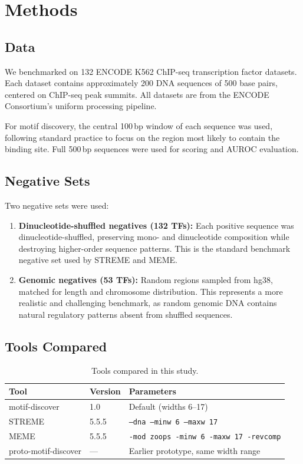 \section{Methods}
\label{sec:methods}

\subsection{Data}

We benchmarked on 132 ENCODE K562 ChIP-seq transcription factor datasets. Each dataset contains approximately 200 DNA sequences of 500 base pairs, centered on ChIP-seq peak summits. All datasets are from the ENCODE Consortium's uniform processing pipeline.

For motif discovery, the central 100\,bp window of each sequence was used, following standard practice to focus on the region most likely to contain the binding site. Full 500\,bp sequences were used for scoring and AUROC evaluation.

\subsection{Negative Sets}

Two negative sets were used:

\begin{enumerate}
    \item \textbf{Dinucleotide-shuffled negatives (132 TFs):} Each positive sequence was dinucleotide-shuffled, preserving mono- and dinucleotide composition while destroying higher-order sequence patterns. This is the standard benchmark negative set used by STREME and MEME.
    
    \item \textbf{Genomic negatives (53 TFs):} Random regions sampled from hg38, matched for length and chromosome distribution. This represents a more realistic and challenging benchmark, as random genomic DNA contains natural regulatory patterns absent from shuffled sequences.
\end{enumerate}

\subsection{Tools Compared}

\begin{table}[H]
\centering
\caption{Tools compared in this study.}
\label{tab:tools}
\small
\begin{tabular}{lll}
\toprule
Tool & Version & Parameters \\
\midrule
motif-discover       & 1.0    & Default (widths 6--17) \\
STREME               & 5.5.5  & \texttt{--dna --minw 6 --maxw 17} \\
MEME                 & 5.5.5  & \texttt{-mod zoops -minw 6 -maxw 17 -revcomp} \\
proto-motif-discover & ---    & Earlier prototype, same width range \\
\bottomrule
\end{tabular}
\end{table}

